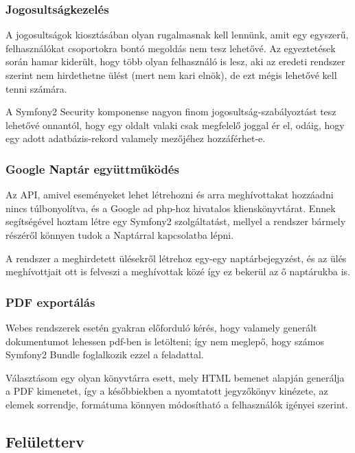\documentclass[a4paper,12pt,oneside]{report}
\begin{document}
\subsubsection{Jogosultságkezelés}

A jogosultságok kiosztásában olyan rugalmasnak kell lennünk, amit egy egyszerű, felhasználókat csoportokra bontó megoldás nem tesz lehetővé. Az egyeztetések során hamar kiderült, hogy több olyan felhasználó is lesz, aki az eredeti rendszer szerint nem hirdethetne ülést (mert nem kari elnök), de ezt mégis lehetővé kell tenni számára.

A Symfony2 Security komponense nagyon finom jogosultság-szabályoztást tesz lehetővé onnantól, hogy egy oldalt valaki csak megfelelő joggal ér el, odáig, hogy egy adott adatbázis-rekord valamely mezőjéhez hozzáférhet-e.

\subsubsection{Google Naptár együttműködés}

Az API, amivel eseményeket lehet létrehozni és arra meghívottakat hozzáadni\cite{website:gcal_event_api} nincs túlbonyolítva, és a Google ad php-hoz hivatalos klienskönyvtárat\cite{website:google_api_client}. Ennek segítségével hoztam létre egy Symfony2 szolgáltatást, mellyel a rendszer bármely részéről könnyen tudok a Naptárral kapcsolatba lépni.

A rendszer a meghirdetett ülésekről létrehoz egy-egy naptárbejegyzést, és az ülés meghívottjait ott is felveszi a meghívottak közé \textendash{} így ez bekerül az ő naptárukba is.

\subsubsection{PDF exportálás}

Webes rendszerek esetén gyakran előforduló kérés, hogy valamely generált dokumentumot lehessen pdf-ben is letölteni; így nem meglepő, hogy számos Symfony2 Bundle foglalkozik ezzel a feladattal.

Választásom egy olyan könyvtárra esett, mely HTML bemenet alapján generálja a PDF kimenetet, így a későbbiekben a nyomtatott jegyzőkönyv kinézete, az elemek sorrendje, formátuma könnyen módosítható a felhasználók igényei szerint.

\subsection{Felületterv}
\end{document}
